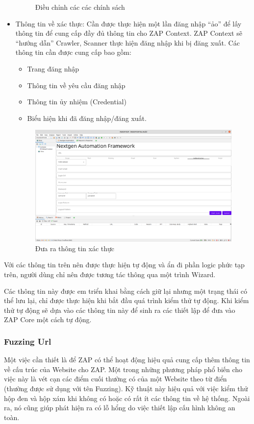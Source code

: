 \documentclass[./../main.tex]{subfiles}
\begin{document}
\begin{itemize}
\begin{figure}[H]
		      \caption{ Điều chỉnh các các chính sách }
		      \label{fig:policy}
	      \end{figure}
	\item Thông tin về xác thực: Cần được thực hiện một lần đăng nhập “ảo” để lấy thông tin để cung cấp đầy đủ thông tin cho ZAP Context. ZAP Context sẽ “hướng dẫn” Crawler, Scanner thực hiện đăng nhập khi bị đăng xuất. Các thông tin cần được cung cấp bao gồm:
	      \begin{itemize}
		      \item Trang đăng nhập
		      \item Thông tin về yêu cầu đăng nhập
		      \item Thông tin ủy nhiệm (Credential)
		      \item Biểu hiện khi đã đăng nhập/đăng xuất.
	      \end{itemize}
	      \begin{figure}[H]
		      \includegraphics[width=\linewidth]{./images/authen.png}
		      \caption{ Đưa ra thông tin xác thực }
		      \label{fig:authen}
	      \end{figure}

\end{itemize}
Với các thông tin trên nên được thực hiện tự động và ẩn đi phần logic phức tạp trên, người dùng chỉ nên được tương tác thông qua một trình Wizard.

Các thông tin này được em triển khai bằng cách giữ lại nhưng một trạng thái có thể lưu lại, chỉ được thực hiện khi bắt đầu quá trình kiểm thử tự động. Khi kiểm thử tự động sẽ dựa vào các thông tin này để sinh ra các thiết lập để đưa vào ZAP Core một cách tự động.

\subsubsection{Fuzzing Url}
Một việc cần thiết là để ZAP có thể hoạt động hiệu quả cung cấp thêm thông tin về cấu trúc của Website cho ZAP. Một trong những phương pháp phổ biến cho việc này là vét cạn các điểm cuối thường có của một Website theo từ điển (thường được sử dụng với tên Fuzzing). Kỹ thuật này hiệu quả với việc kiểm thử hộp đen và hộp xám khi không có hoặc có rất ít các thông tin về hệ thống. Ngoài ra, nó cũng giúp phát hiện ra có lỗ hổng do việc thiết lập cấu hình không an toàn.
\end{document}

